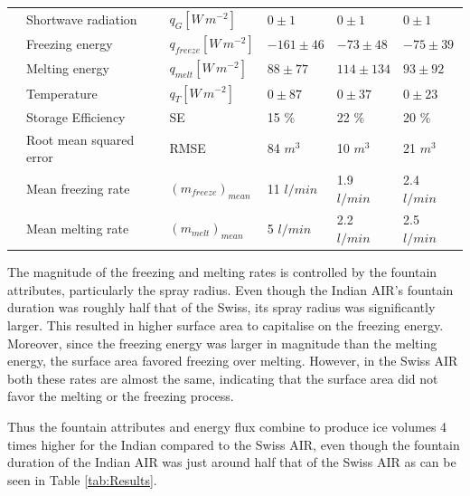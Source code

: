 \documentclass[utf8]{frontiersSCNS} %
\begin{document}
\begin{table}
\begin{tabular}{@{}|llllll|@{}}
		\multicolumn{1}{|l|}{} & Shortwave radiation     & $q_{G} [W\,m^{-2}]  $     & $0 \pm 1$     & $0 \pm 1$     & $0 \pm 1$     \\
		\multicolumn{1}{|l|}{} & Freezing energy         & $q_{freeze} [W\,m^{-2}] $ & $-161\pm 46$  & $-73 \pm 48$  & $-75\pm 39$   \\
		\multicolumn{1}{|l|}{} & Melting energy          & $q_{melt} [W\,m^{-2}] $   & $88 \pm 77$   & $114\pm 134$  & $93 \pm 92$   \\
		\multicolumn{1}{|l|}{} & Temperature             & $q_{T} [W\,m^{-2}] $      & $0 \pm 87$    & $0 \pm 37$    & $0 \pm 23$    \\\midrule
		\multicolumn{1}{|l|}{\multirow{3}{*}{\rotatebox[origin=c]{90}{Charecteristics}}}
		                       & Storage Efficiency      & SE                        & 15 \%         & 22 \%         & 20 \%         \\
		\multicolumn{1}{|l|}{} & Root mean squared error & RMSE                      & 84 $m^{3}$    & 10 $m^{3}$    & 21 $m^{3}$    \\
		\multicolumn{1}{|l|}{} & Mean freezing rate      & $(m_{freeze})_{mean}$     & 11 $l/min$    & 1.9 $l/min$   & 2.4 $l/min$   \\
		\multicolumn{1}{|l|}{} & Mean melting rate       & $(m_{melt})_{mean}$       & 5 $l/min$     & 2.2 $l/min$   & 2.5 $l/min$   \\\bottomrule
	\end{tabular}
\end{table}

The magnitude of the freezing and melting rates is controlled by the fountain attributes, particularly the spray radius.
Even though the Indian AIR's fountain duration was roughly half that of the Swiss, its spray radius was significantly
larger. This resulted in higher surface area to capitalise on the freezing energy. Moreover, since the freezing energy
was larger in magnitude than the melting energy, the surface area favored freezing over melting. However, in the Swiss
AIR both these rates are almost the same, indicating that the surface area did not favor the melting or the freezing process.

Thus the fountain attributes and energy flux combine to produce ice volumes 4 times higher for the Indian compared to the Swiss AIR, even though the fountain duration of the Indian AIR was just around half that of the Swiss AIR as can be seen in Table \ref{tab:Results}.
\end{document}

